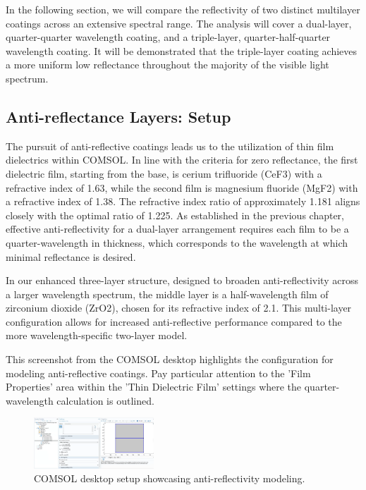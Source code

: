 In the following section, we will compare the reflectivity of two distinct multilayer coatings across an extensive spectral range. The analysis will cover a dual-layer, quarter-quarter wavelength coating, and a triple-layer, quarter-half-quarter wavelength coating. It will be demonstrated that the triple-layer coating achieves a more uniform low reflectance throughout the majority of the visible light spectrum.



\subsection{Anti-reflectance Layers: Setup}

The pursuit of anti-reflective coatings leads us to the utilization of thin film dielectrics within COMSOL. In line with the criteria for zero reflectance, the first dielectric film, starting from the base, is cerium trifluoride (CeF3) with a refractive index of 1.63, while the second film is magnesium fluoride (MgF2) with a refractive index of 1.38. The refractive index ratio of approximately 1.181 aligns closely with the optimal ratio of 1.225. As established in the previous chapter, effective anti-reflectivity for a dual-layer arrangement requires each film to be a quarter-wavelength in thickness, which corresponds to the wavelength at which minimal reflectance is desired.

In our enhanced three-layer structure, designed to broaden anti-reflectivity across a larger wavelength spectrum, the middle layer is a half-wavelength film of zirconium dioxide (ZrO2), chosen for its refractive index of 2.1. This multi-layer configuration allows for increased anti-reflective performance compared to the more wavelength-specific two-layer model.

This screenshot from the COMSOL desktop highlights the configuration for modeling anti-reflective coatings. Pay particular attention to the 'Film Properties' area within the 'Thin Dielectric Film' settings where the quarter-wavelength calculation is outlined.

\begin{figure}[ht!]
  \centering
  \includegraphics[width=0.4\textwidth]{Chapters/Figures/Chapter 4 Figures/COMSOL Desktop Showcasing Antireflectivity Setup.png}
  \caption{COMSOL desktop setup showcasing anti-reflectivity modeling.}
  \label{fig:COMSOL desktop showcasing antireflectivity}
\end{figure}

